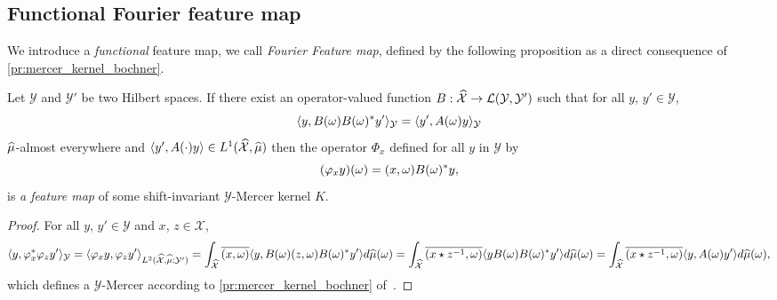 \subsection{Functional Fourier feature map}
We introduce a \emph{functional} feature map, we call \emph{Fourier 
Feature map}, defined by the following proposition as a direct consequence of
\cref{pr:mercer_kernel_bochner}.
\begin{proposition}
    \label{pr:fourier_feature_map} Let $\mathcal{Y}$ and $\mathcal{Y}'$ be two
    Hilbert spaces. If there exist an operator-valued function
    $B:\widehat{\mathcal{X}}\to\mathcal{L}(\mathcal{Y},\mathcal{Y}')$ such that
    for all $y$, $y'\in\mathcal{Y}$,
    \begin{dmath*}
        \inner{y, B(\omega)B(\omega)^\adjoint y'}_{\mathcal{Y}}
        =\inner{y', A(\omega)y}_{\mathcal{Y}}
    \end{dmath*}
    $\widehat{\mu}$-almost everywhere and $\langle y', A(\cdot)y\rangle\in
    L^1(\widehat{\mathcal{X}},\widehat{\mu})$ then the operator $\Phi_x$ defined for
    all $y$ in $\mathcal{Y}$ by
    \begin{dmath}
        \label{eq:feature_shiftinv_map}
        (\Phi_x y)(\omega)=\pairing{x,\omega}B(\omega)^\adjoint y,
    \end{dmath}
    is \emph{a feature map} of some shift-invariant
    $\mathcal{Y}$-Mercer kernel $K$.
\end{proposition}
\begin{proof}
    For all $y$, $y'\in \mathcal{Y}$ and $x$, $z\in\mathcal{X}$,
    \begin{dmath*}
        \inner{y, \Phi_x^\adjoint \Phi_z y'}_{\mathcal{Y}} = \inner{\Phi_x y,
        \Phi_z y'}_{L^2(\dual{\mathcal{X}},\dual{\mu};\mathcal{Y}')} \\ =
        \int_{\dual{\mathcal{X}}}\conj{\pairing{x,\omega}}\inner{y,
        B(\omega)\pairing{z,\omega}B(\omega)^\adjoint y'}d\dual{\mu}(\omega) \\
        = \int_{\dual{\mathcal{X}}}\conj{\pairing{x \groupop
        \myinv{z},\omega}}\inner{y B(\omega)B(\omega)^\adjoint
        y'}d\dual{\mu}(\omega) \\ = \int_{\dual{\mathcal{X}}}\conj{\pairing{x
        \groupop \inv{z},\omega}}\inner{y,A(\omega)y'}d\dual{\mu}(\omega),
    \end{dmath*}
    which defines a $\mathcal{Y}$-Mercer according to
    \cref{pr:mercer_kernel_bochner} of~\citet{Carmeli2010}.
\end{proof}
